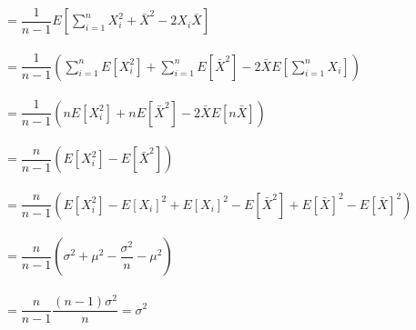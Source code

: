 \documentclass{article}
\begin{document}
\begin{itemize}
    $=\dfrac{1}{n-1}E[\sum_{i=1}^nX_i^2+\bar{X}^2-2X_i\bar{X}]$\\\\
    $=\dfrac{1}{n-1}(\sum_{i=1}^nE[X_i^2]+\sum_{i=1}^nE[\bar{X}^2]-2\bar{X}E[\sum_{i=1}^nX_i])$\\\\
    $=\dfrac{1}{n-1}(nE[X_i^2]+nE[\bar{X}^2]-2\bar{X}E[n\bar{X}])$\\\\
    $=\dfrac{n}{n-1}(E[X_i^2]-E[\bar{X}^2])$\\\\
    $=\dfrac{n}{n-1}(E[X_i^2]-E[X_i]^2+E[X_i]^2-E[\bar{X}^2]+E[\bar{X}]^2-E[\bar{X}]^2)$\\\\
    $=\dfrac{n}{n-1}(\sigma^2+\mu^2-\dfrac{\sigma^2}{n}-\mu^2)$\\\\
    $=\dfrac{n}{n-1}\dfrac{(n-1)\sigma^2}{n}=\sigma^2$
\end{itemize}
\end{document}
